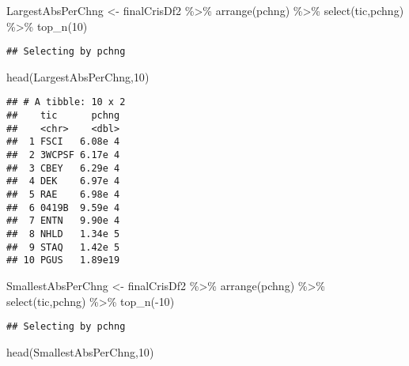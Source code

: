 \documentclass[
]{article}
\newenvironment{Shaded}{\begin{snugshade}}{\end{snugshade}}
\newcommand{\DecValTok}[1]{\textcolor[rgb]{0.00,0.00,0.81}{#1}}
\newcommand{\FunctionTok}[1]{\textcolor[rgb]{0.00,0.00,0.00}{#1}}
\newcommand{\NormalTok}[1]{#1}
\newcommand{\OtherTok}[1]{\textcolor[rgb]{0.56,0.35,0.01}{#1}}
\newcommand{\SpecialCharTok}[1]{\textcolor[rgb]{0.00,0.00,0.00}{#1}}
\begin{document}
\begin{Shaded}
\begin{Highlighting}[]
\NormalTok{LargestAbsPerChng }\OtherTok{\textless{}{-}}\NormalTok{ finalCrisDf2 }\SpecialCharTok{\%\textgreater{}\%} \FunctionTok{arrange}\NormalTok{(pchng) }\SpecialCharTok{\%\textgreater{}\%} \FunctionTok{select}\NormalTok{(tic,pchng) }\SpecialCharTok{\%\textgreater{}\%} \FunctionTok{top\_n}\NormalTok{(}\DecValTok{10}\NormalTok{)}
\end{Highlighting}
\end{Shaded}

\begin{verbatim}
## Selecting by pchng
\end{verbatim}

\begin{Shaded}
\begin{Highlighting}[]
\FunctionTok{head}\NormalTok{(LargestAbsPerChng,}\DecValTok{10}\NormalTok{)}
\end{Highlighting}
\end{Shaded}

\begin{verbatim}
## # A tibble: 10 x 2
##    tic      pchng
##    <chr>    <dbl>
##  1 FSCI   6.08e 4
##  2 3WCPSF 6.17e 4
##  3 CBEY   6.29e 4
##  4 DEK    6.97e 4
##  5 RAE    6.98e 4
##  6 0419B  9.59e 4
##  7 ENTN   9.90e 4
##  8 NHLD   1.34e 5
##  9 STAQ   1.42e 5
## 10 PGUS   1.89e19
\end{verbatim}

\begin{Shaded}
\begin{Highlighting}[]
\NormalTok{SmallestAbsPerChng }\OtherTok{\textless{}{-}}\NormalTok{ finalCrisDf2 }\SpecialCharTok{\%\textgreater{}\%} \FunctionTok{arrange}\NormalTok{(pchng) }\SpecialCharTok{\%\textgreater{}\%} \FunctionTok{select}\NormalTok{(tic,pchng) }\SpecialCharTok{\%\textgreater{}\%} \FunctionTok{top\_n}\NormalTok{(}\SpecialCharTok{{-}}\DecValTok{10}\NormalTok{)}
\end{Highlighting}
\end{Shaded}

\begin{verbatim}
## Selecting by pchng
\end{verbatim}

\begin{Shaded}
\begin{Highlighting}[]
\FunctionTok{head}\NormalTok{(SmallestAbsPerChng,}\DecValTok{10}\NormalTok{)}
\end{Highlighting}
\end{Shaded}
\end{document}
